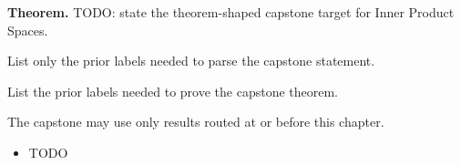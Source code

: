 \label{cap:inner-product-spaces}

\begin{tcolorbox}[
  colback=gray!6,
  colframe=gray!40,
  arc=2pt,
  left=8pt, right=8pt, top=6pt, bottom=6pt,
  title={\small\textbf{Capstone Theorem}},
  fonttitle=\small\bfseries
]
\textbf{Theorem.}
TODO: state the theorem-shaped capstone target for Inner Product Spaces.
\end{tcolorbox}

\begin{remark*}
List only the prior labels needed to parse the capstone statement.
\end{remark*}

\begin{remark*}
List the prior labels needed to prove the capstone theorem.
\end{remark*}

\begin{remark*}
The capstone may use only results routed at or before this chapter.
\end{remark*}

\begin{dependencies}
\begin{itemize}
  \item TODO
\end{itemize}
\end{dependencies}

\clearpage
